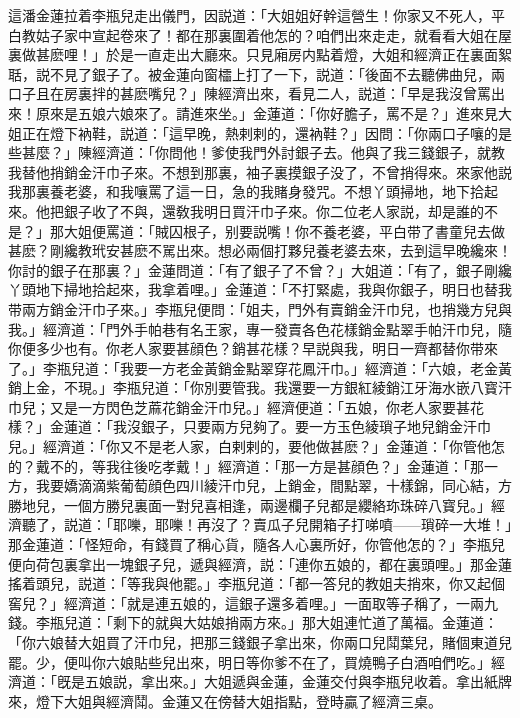 這潘金蓮拉着李瓶兒走出儀門，因説道：「大姐姐好幹這營生！你家又不死人，平白教姑子家中宣起卷來了！都在那裏圍着他怎的？咱們出來走走，就看看大姐在屋裏做甚麽哩！」於是一直走出大廳來。只見廂房内點着燈，大姐和經濟正在裏面絮聒，説不見了銀子了。被金蓮向窗櫺上打了一下，説道：「後面不去聽佛曲兒，兩口子且在房裏拌的甚麽嘴兒？」陳經濟出來，看見二人，説道：「早是我沒曾罵出來！原來是五娘六娘來了。請進來坐。」金蓮道：「你好膽子，罵不是？」進來見大姐正在燈下衲鞋，説道：「這早晚，熱剌剌的，還衲鞋？」因問：「你兩口子嚷的是些甚麼？」陳經濟道：「你問他！爹使我門外討銀子去。他與了我三錢銀子，就教我替他捎銷金汗巾子來。不想到那裏，袖子裏摸銀子没了，不曾捎得來。來家他説我那裏養老婆，和我嚷罵了這一日，急的我賭身發咒。不想丫頭掃地，地下拾起來。他把銀子收了不與，還敎我明日買汗巾子來。你二位老人家説，却是誰的不是？」那大姐便罵道：「賊囚根子，别要説嘴！你不養老婆，平白带了書童兒去做甚麽？剛纔教玳安甚麽不駡出來。想必兩個打夥兒養老婆去來，去到這早晚纔來！你討的銀子在那裏？」金蓮問道：「有了銀子了不曾？」大姐道：「有了，銀子剛纔丫頭地下掃地拾起來，我拿着哩。」金蓮道：「不打緊處，我與你銀子，明日也替我带兩方銷金汗巾子來。」李瓶兒便問：「姐夫，門外有賣銷金汗巾兒，也捎幾方兒與我。」經濟道：「門外手帕巷有名王家，專一發賣各色花樣銷金點翠手帕汗巾兒，隨你便多少也有。你老人家要甚顔色？銷甚花樣？早説與我，明日一齊都替你带來了。」李瓶兒道：「我要一方老金黃銷金點翠穿花鳳汗巾。」經濟道：「六娘，老金黃銷上金，不現。」李瓶兒道：「你別要管我。我還要一方銀紅綾銷江牙海水嵌八寳汗巾兒；又是一方閃色芝蔴花銷金汗巾兒。」經濟便道：「五娘，你老人家要甚花樣？」金蓮道：「我沒銀子，只要兩方兒夠了。要一方玉色綾瑣子地兒銷金汗巾兒。」經濟道：「你又不是老人家，白剌剌的，要他做甚麽？」金蓮道：「你管他怎的？戴不的，等我往後吃孝戴！」經濟道：「那一方是甚顔色？」金蓮道：「那一方，我要嬌滴滴紫葡萄顔色四川綾汗巾兒，上銷金，間點翠，十樣錦，同心結，方勝地兒，一個方勝兒裏面一對兒喜相逢，兩邊欄子兒都是纓絡珎珠碎八寳兒。」經濟聽了，説道：「耶嚛，耶嚛！再沒了？賣瓜子兒開箱子打㖒噴——瑣碎一大堆！」那金蓮道：「怪短命，有錢買了稱心貨，隨各人心裏所好，你管他怎的？」李瓶兒便向荷包裏拿出一塊銀子兒，遞與經濟，説：「連你五娘的，都在裏頭哩。」那金蓮搖着頭兒，説道：「等我與他罷。」李瓶兒道：「都一答兒的教姐夫捎來，你又起個窖兒？」經濟道：「就是連五娘的，這銀子還多着哩。」一面取等子稱了，一兩九錢。李瓶兒道：「剩下的就與大姑娘捎兩方來。」那大姐連忙道了萬福。金蓮道：「你六娘替大姐買了汗巾兒，把那三錢銀子拿出來，你兩口兒鬦葉兒，賭個東道兒罷。少，便叫你六娘貼些兒出來，明日等你爹不在了，買燒鴨子白酒咱們吃。」經濟道：「旣是五娘説，拿出來。」大姐遞與金蓮，金蓮交付與李瓶兒收着。拿出紙牌來，燈下大姐與經濟鬦。金蓮又在傍替大姐指點，登時贏了經濟三桌。

